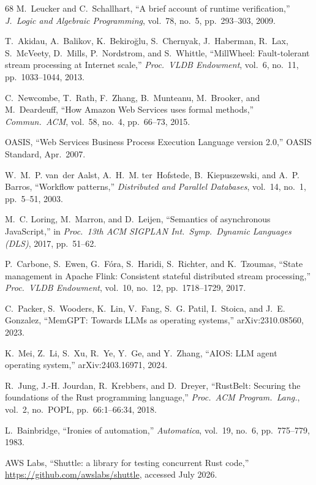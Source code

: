\documentclass[10pt,journal,compsoc]{IEEEtran}
\begin{document}
\begin{thebibliography}{68}
 M.~Leucker and C.~Schallhart, ``A brief account of
runtime verification,'' \emph{J.\ Logic and Algebraic Programming}, vol.~78,
no.~5, pp.~293--303, 2009.

 T.~Akidau, A.~Balikov, K.~Bekiro\u{g}lu, S.~Chernyak,
J.~Haberman, R.~Lax, S.~McVeety, D.~Mills, P.~Nordstrom, and S.~Whittle,
``MillWheel: Fault-tolerant stream processing at Internet scale,''
\emph{Proc.\ VLDB Endowment}, vol.~6, no.~11, pp.~1033--1044, 2013.

 C.~Newcombe, T.~Rath, F.~Zhang, B.~Munteanu,
M.~Brooker, and M.~Deardeuff, ``How Amazon Web Services uses formal
methods,'' \emph{Commun.\ ACM}, vol.~58, no.~4, pp.~66--73, 2015.

 OASIS, ``Web Services Business Process Execution Language
version 2.0,'' OASIS Standard, Apr.\ 2007.

 W.~M.~P. van~der Aalst, A.~H.~M. ter~Hofstede,
B.~Kiepuszewski, and A.~P. Barros, ``Workflow patterns,''
\emph{Distributed and Parallel Databases}, vol.~14, no.~1, pp.~5--51, 2003.

 M.~C. Loring, M.~Marron, and D.~Leijen, ``Semantics of
asynchronous JavaScript,'' in \emph{Proc.\ 13th ACM SIGPLAN Int.\ Symp.\
Dynamic Languages (DLS)}, 2017, pp.~51--62.

 P.~Carbone, S.~Ewen, G.~F\'ora, S.~Haridi, S.~Richter, and
K.~Tzoumas, ``State management in Apache Flink: Consistent stateful
distributed stream processing,'' \emph{Proc.\ VLDB Endowment}, vol.~10,
no.~12, pp.~1718--1729, 2017.

 C.~Packer, S.~Wooders, K.~Lin, V.~Fang, S.~G. Patil,
I.~Stoica, and J.~E. Gonzalez, ``MemGPT: Towards LLMs as operating
systems,'' arXiv:2310.08560, 2023.

 K.~Mei, Z.~Li, S.~Xu, R.~Ye, Y.~Ge, and Y.~Zhang, ``AIOS:
LLM agent operating system,'' arXiv:2403.16971, 2024.

 R.~Jung, J.-H. Jourdan, R.~Krebbers, and D.~Dreyer,
``RustBelt: Securing the foundations of the Rust programming language,''
\emph{Proc.\ ACM Program.\ Lang.}, vol.~2, no.~POPL, pp.~66:1--66:34, 2018.

 L.~Bainbridge, ``Ironies of automation,''
\emph{Automatica}, vol.~19, no.~6, pp.~775--779, 1983.

 AWS Labs, ``Shuttle: a library for testing concurrent Rust
code,'' \url{https://github.com/awslabs/shuttle}, accessed July 2026.


\end{thebibliography}
\end{document}
